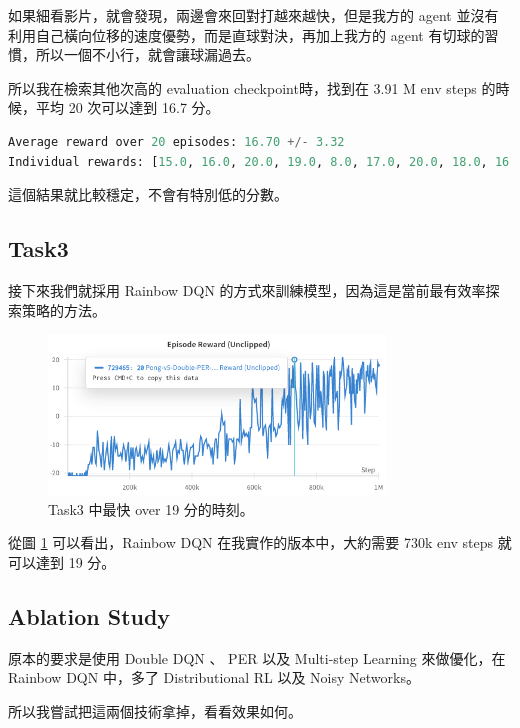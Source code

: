如果細看影片，就會發現，兩邊會來回對打越來越快，但是我方的 agent 並沒有利用自己橫向位移的速度優勢，而是直球對決，再加上我方的 agent 有切球的習慣，所以一個不小行，就會讓球漏過去。

所以我在檢索其他次高的 evaluation checkpoint時，找到在 3.91 M env steps 的時候，平均 20 次可以達到 16.7 分。


\begin{lstlisting}[language=Python, caption=Task2 中 20 次評估的結果，second high evaluation results。]
Average reward over 20 episodes: 16.70 +/- 3.32
Individual rewards: [15.0, 16.0, 20.0, 19.0, 8.0, 17.0, 20.0, 18.0, 16.0, 15.0, 19.0, 19.0, 10.0, 13.0, 20.0, 17.0, 19.0, 19.0, 14.0, 20.0]
\end{lstlisting}

這個結果就比較穩定，不會有特別低的分數。

\subsection{Task3}
接下來我們就採用 Rainbow DQN 的方式來訓練模型，因為這是當前最有效率探索策略的方法。


\begin{figure}[htbp]
    \centering
    \includegraphics[width=0.8\textwidth]{figures/Task3_efficiency.png}
    \caption{Task3 中最快 over 19 分的時刻。}
    \label{fig:task3_efficiency}
\end{figure}

從圖 \ref{fig:task3_efficiency} 可以看出，Rainbow DQN 在我實作的版本中，大約需要 730k env steps 就可以達到 19 分。


\subsection{Ablation Study}

原本的要求是使用 Double DQN 、 PER 以及 Multi-step Learning 來做優化，在 Rainbow DQN 中，多了 Distributional RL 以及 Noisy Networks。

所以我嘗試把這兩個技術拿掉，看看效果如何。

